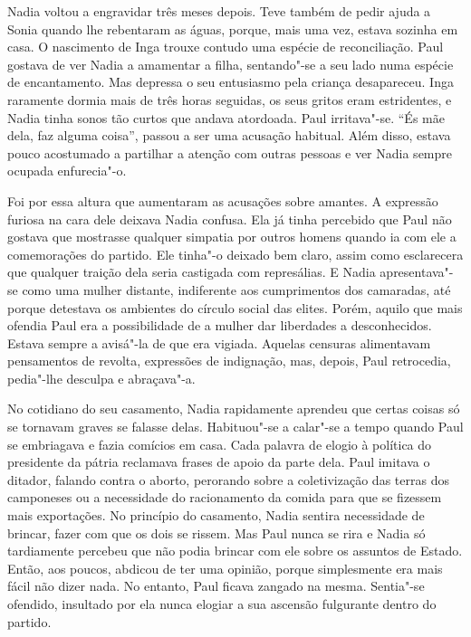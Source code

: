 Nadia voltou a engravidar três meses depois. Teve também de pedir
ajuda a Sonia quando lhe rebentaram as águas, porque, mais uma vez,
estava sozinha em casa. O nascimento de Inga trouxe contudo uma espécie
de reconciliação. Paul gostava de ver Nadia a amamentar a filha,
sentando"-se a seu lado numa espécie de encantamento. Mas depressa o
seu entusiasmo pela criança desapareceu. Inga raramente dormia mais de
três horas seguidas, os seus gritos eram estridentes, e Nadia tinha
sonos tão curtos que andava atordoada. Paul irritava"-se. ``És mãe dela,
faz alguma coisa'', passou a ser uma acusação habitual. Além disso,
estava pouco acostumado a partilhar a atenção com outras pessoas e ver
Nadia sempre ocupada enfurecia"-o.

Foi por essa altura que aumentaram as acusações
sobre amantes. A expressão furiosa na cara dele deixava Nadia confusa.
Ela já tinha percebido que Paul não gostava que mostrasse qualquer
simpatia por outros homens quando ia com ele a comemorações do partido.
Ele tinha"-o deixado bem claro, assim como esclarecera que qualquer
traição dela seria castigada com represálias. E Nadia apresentava"-se
como uma mulher distante, indiferente aos cumprimentos dos camaradas,
até porque detestava os ambientes do círculo social das elites. Porém,
aquilo que mais ofendia Paul era a possibilidade de a mulher dar
liberdades a desconhecidos. Estava sempre a avisá"-la de que era vigiada.
Aquelas censuras alimentavam pensamentos de revolta, expressões de
indignação, mas, depois, Paul retrocedia, pedia"-lhe desculpa e abraçava"-a.

No cotidiano do seu casamento, Nadia rapidamente aprendeu que certas
coisas só se tornavam graves se falasse delas. Habituou"-se a calar"-se a
tempo quando Paul se embriagava e fazia comícios em casa. Cada palavra
de elogio à política do presidente da pátria reclamava frases de apoio
da parte dela. Paul imitava o ditador, falando contra o aborto,
perorando sobre a coletivização das terras dos camponeses ou a
necessidade do racionamento da comida para que se fizessem mais
exportações. No princípio do casamento, Nadia sentira necessidade de
brincar, fazer com que os dois se rissem. Mas Paul nunca se rira e Nadia
só tardiamente percebeu que não podia brincar com ele sobre os assuntos
de Estado. Então, aos poucos, abdicou de ter uma opinião, porque
simplesmente era mais fácil não dizer nada. No entanto, Paul ficava
zangado na mesma. Sentia"-se ofendido, insultado por ela nunca elogiar a
sua ascensão fulgurante dentro do partido.

